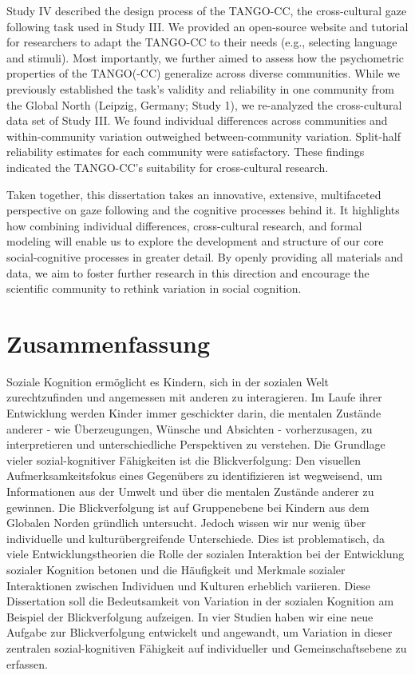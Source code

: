 \documentclass[
]{scrbook}
\begin{document}
Study IV described the design process of the TANGO-CC, the cross-cultural gaze following task used in Study III. We provided an open-source website and tutorial for researchers to adapt the TANGO-CC to their needs (e.g., selecting language and stimuli). Most importantly, we further aimed to assess how the psychometric properties of the TANGO(-CC) generalize across diverse communities. While we previously established the task's validity and reliability in one community from the Global North (Leipzig, Germany; Study 1), we re-analyzed the cross-cultural data set of Study III. We found individual differences across communities and within-community variation outweighed between-community variation. Split-half reliability estimates for each community were satisfactory. These findings indicated the TANGO-CC's suitability for cross-cultural research.

Taken together, this dissertation takes an innovative, extensive, multifaceted perspective on gaze following and the cognitive processes behind it. It highlights how combining individual differences, cross-cultural research, and formal modeling will enable us to explore the development and structure of our core social-cognitive processes in greater detail. By openly providing all materials and data, we aim to foster further research in this direction and encourage the scientific community to rethink variation in social cognition.

\chapter{Zusammenfassung}\label{zusammenfassung}

Soziale Kognition ermöglicht es Kindern, sich in der sozialen Welt zurechtzufinden und angemessen mit anderen zu interagieren. Im Laufe ihrer Entwicklung werden Kinder immer geschickter darin, die mentalen Zustände anderer - wie Überzeugungen, Wünsche und Absichten - vorherzusagen, zu interpretieren und unterschiedliche Perspektiven zu verstehen. Die Grundlage vieler sozial-kognitiver Fähigkeiten ist die Blickverfolgung: Den visuellen Aufmerksamkeitsfokus eines Gegenübers zu identifizieren ist wegweisend, um Informationen aus der Umwelt und über die mentalen Zustände anderer zu gewinnen. Die Blickverfolgung ist auf Gruppenebene bei Kindern aus dem Globalen Norden gründlich untersucht. Jedoch wissen wir nur wenig über individuelle und kulturübergreifende Unterschiede. Dies ist problematisch, da viele Entwicklungstheorien die Rolle der sozialen Interaktion bei der Entwicklung sozialer Kognition betonen und die Häufigkeit und Merkmale sozialer Interaktionen zwischen Individuen und Kulturen erheblich variieren. Diese Dissertation soll die Bedeutsamkeit von Variation in der sozialen Kognition am Beispiel der Blickverfolgung aufzeigen. In vier Studien haben wir eine neue Aufgabe zur Blickverfolgung entwickelt und angewandt, um Variation in dieser zentralen sozial-kognitiven Fähigkeit auf individueller und Gemeinschaftsebene zu erfassen.
\end{document}
